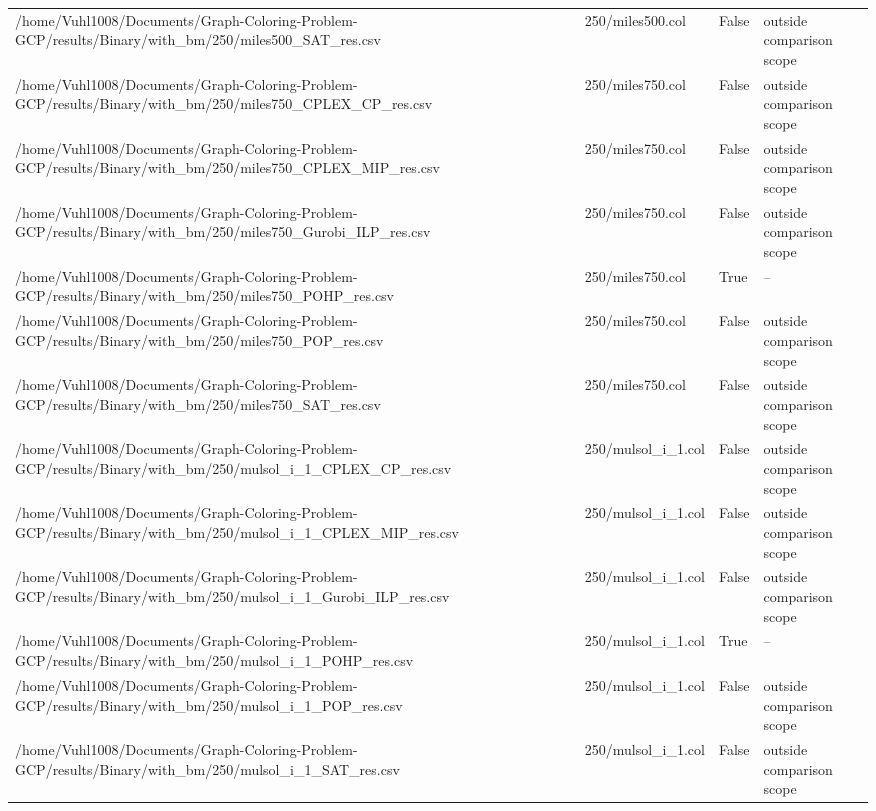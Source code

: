 \begin{table}[htbp]
\begin{tabular}{llll}
/home/Vuhl1008/Documents/Graph-Coloring-Problem-GCP/results/Binary/with\_bm/250/miles500\_SAT\_res.csv & 250/miles500.col & False & outside comparison scope \\
/home/Vuhl1008/Documents/Graph-Coloring-Problem-GCP/results/Binary/with\_bm/250/miles750\_CPLEX\_CP\_res.csv & 250/miles750.col & False & outside comparison scope \\
/home/Vuhl1008/Documents/Graph-Coloring-Problem-GCP/results/Binary/with\_bm/250/miles750\_CPLEX\_MIP\_res.csv & 250/miles750.col & False & outside comparison scope \\
/home/Vuhl1008/Documents/Graph-Coloring-Problem-GCP/results/Binary/with\_bm/250/miles750\_Gurobi\_ILP\_res.csv & 250/miles750.col & False & outside comparison scope \\
/home/Vuhl1008/Documents/Graph-Coloring-Problem-GCP/results/Binary/with\_bm/250/miles750\_POHP\_res.csv & 250/miles750.col & True & -- \\
/home/Vuhl1008/Documents/Graph-Coloring-Problem-GCP/results/Binary/with\_bm/250/miles750\_POP\_res.csv & 250/miles750.col & False & outside comparison scope \\
/home/Vuhl1008/Documents/Graph-Coloring-Problem-GCP/results/Binary/with\_bm/250/miles750\_SAT\_res.csv & 250/miles750.col & False & outside comparison scope \\
/home/Vuhl1008/Documents/Graph-Coloring-Problem-GCP/results/Binary/with\_bm/250/mulsol\_i\_1\_CPLEX\_CP\_res.csv & 250/mulsol\_i\_1.col & False & outside comparison scope \\
/home/Vuhl1008/Documents/Graph-Coloring-Problem-GCP/results/Binary/with\_bm/250/mulsol\_i\_1\_CPLEX\_MIP\_res.csv & 250/mulsol\_i\_1.col & False & outside comparison scope \\
/home/Vuhl1008/Documents/Graph-Coloring-Problem-GCP/results/Binary/with\_bm/250/mulsol\_i\_1\_Gurobi\_ILP\_res.csv & 250/mulsol\_i\_1.col & False & outside comparison scope \\
/home/Vuhl1008/Documents/Graph-Coloring-Problem-GCP/results/Binary/with\_bm/250/mulsol\_i\_1\_POHP\_res.csv & 250/mulsol\_i\_1.col & True & -- \\
/home/Vuhl1008/Documents/Graph-Coloring-Problem-GCP/results/Binary/with\_bm/250/mulsol\_i\_1\_POP\_res.csv & 250/mulsol\_i\_1.col & False & outside comparison scope \\
/home/Vuhl1008/Documents/Graph-Coloring-Problem-GCP/results/Binary/with\_bm/250/mulsol\_i\_1\_SAT\_res.csv & 250/mulsol\_i\_1.col & False & outside comparison scope \\

\end{tabular}
\end{table}
